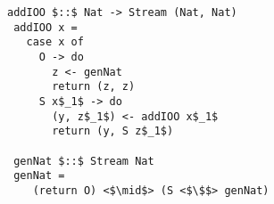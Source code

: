 \begin{figure}[h]
\centering
\begin{minipage}{0.9\columnwidth}
  \begin{lstlisting}[frame=tb]
 addIOO $::$ Nat -> Stream (Nat, Nat)
 addIOO x =
   case x of
     O -> do
       z <- genNat
       return (z, z)
     S x$_1$ -> do
       (y, z$_1$) <- addIOO x$_1$
       return (y, S z$_1$)

 genNat $::$ Stream Nat
 genNat = 
    (return O) <$\mid$> (S <$\$$> genNat)
  \end{lstlisting}
\end{minipage}
\end{figure}

